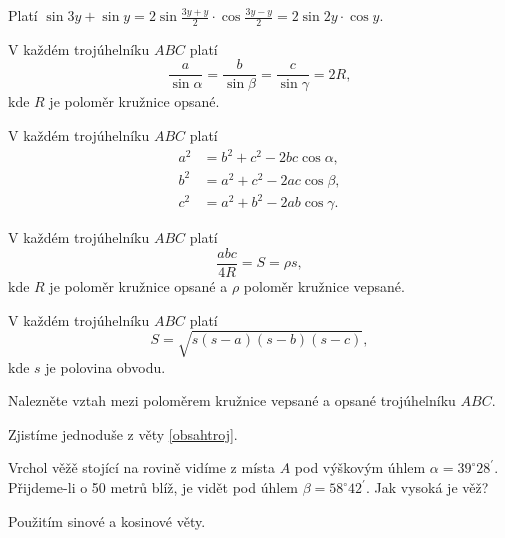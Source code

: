 \begin{reseni}
Platí
$\sin 3y+\sin y=2\sin \frac{3y+y}{2}\cdot \cos \frac{3y-y}{2}=2\sin 2y \cdot \cos y.$
\end{reseni}

\begin{veta}
    V každém trojúhelníku $ABC$ platí
    $$\frac{a}{\sin \alpha} = \frac{b}{\sin \beta}=\frac{c}{\sin \gamma}=2R,$$
    kde $R$ je poloměr kružnice opsané.
\end{veta}

\begin{veta}
 V každém trojúhelníku $ABC$ platí
 \begin{align*}
    a^2 &= b^2+c^2-2bc\cos \alpha, \\
    b^2 &= a^2+c^2-2ac\cos \beta ,\\
    c^2 &= a^2+b^2-2ab\cos \gamma.
 \end{align*}
\end{veta}

\begin{veta}\label{obsahtroj}
     V každém trojúhelníku $ABC$ platí
     $$\frac{abc}{4R}=S=\rho s,$$
     kde $R$ je poloměr kružnice opsané a $\rho$ poloměr kružnice vepsané.
\end{veta}

\begin{veta}
    V každém trojúhelníku $ABC$ platí
    $$S=\sqrt{s(s-a)(s-b)(s-c)}, $$
    kde $s$ je polovina obvodu.
\end{veta}

\begin{priklad}
Nalezněte vztah mezi poloměrem kružnice vepsané a opsané trojúhelníku $ABC$.
\end{priklad}

\begin{reseni}
Zjistíme jednoduše z věty \ref{obsahtroj}.
\end{reseni}

\begin{priklad}
Vrchol věžě stojící na rovině vidíme z místa $A$ pod výškovým úhlem $\alpha= 39^\circ 28^\prime$.
Přijdeme-li o 50 metrů blíž, je vidět pod úhlem $\beta=58^\circ 42^\prime.$ Jak vysoká je věž?
\end{priklad}

\begin{reseni}
Použitím sinové a kosinové věty.
\end{reseni}
